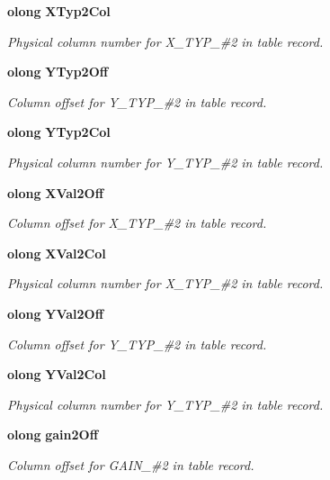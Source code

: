 \begin{CompactItemize}
{\bf olong} {\bf XTyp2Col}
\begin{CompactList}\small\item\em Physical column number for X\_\-TYP\_\-\#2 in table record. \item\end{CompactList}\item 
{\bf olong} {\bf YTyp2Off}
\begin{CompactList}\small\item\em Column offset for Y\_\-TYP\_\-\#2 in table record. \item\end{CompactList}\item 
{\bf olong} {\bf YTyp2Col}
\begin{CompactList}\small\item\em Physical column number for Y\_\-TYP\_\-\#2 in table record. \item\end{CompactList}\item 
{\bf olong} {\bf XVal2Off}
\begin{CompactList}\small\item\em Column offset for X\_\-TYP\_\-\#2 in table record. \item\end{CompactList}\item 
{\bf olong} {\bf XVal2Col}
\begin{CompactList}\small\item\em Physical column number for X\_\-TYP\_\-\#2 in table record. \item\end{CompactList}\item 
{\bf olong} {\bf YVal2Off}
\begin{CompactList}\small\item\em Column offset for Y\_\-TYP\_\-\#2 in table record. \item\end{CompactList}\item 
{\bf olong} {\bf YVal2Col}
\begin{CompactList}\small\item\em Physical column number for Y\_\-TYP\_\-\#2 in table record. \item\end{CompactList}\item 
{\bf olong} {\bf gain2Off}
\begin{CompactList}\small\item\em Column offset for GAIN\_\-\#2 in table record. \item\end{CompactList}\item 

\end{CompactItemize}
